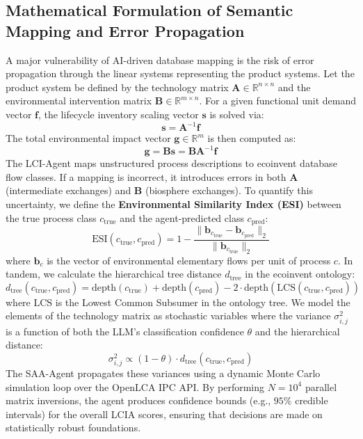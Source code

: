 \documentclass[11pt]{article}
\begin{document}
\subsection{Mathematical Formulation of Semantic Mapping and Error Propagation}
A major vulnerability of AI-driven database mapping is the risk of error propagation through the linear systems representing the product systems. Let the product system be defined by the technology matrix $\mathbf{A} \in \mathbb{R}^{n \times n}$ and the environmental intervention matrix $\mathbf{B} \in \mathbb{R}^{m \times n}$. For a given functional unit demand vector $\mathbf{f}$, the lifecycle inventory scaling vector $\mathbf{s}$ is solved via:
\begin{equation}
    \mathbf{s} = \mathbf{A}^{-1}\mathbf{f}
\end{equation}
The total environmental impact vector $\mathbf{g} \in \mathbb{R}^{m}$ is then computed as:
\begin{equation}
    \mathbf{g} = \mathbf{B}\mathbf{s} = \mathbf{B}\mathbf{A}^{-1}\mathbf{f}
\end{equation}
The LCI-Agent maps unstructured process descriptions to ecoinvent database flow classes. If a mapping is incorrect, it introduces errors in both $\mathbf{A}$ (intermediate exchanges) and $\mathbf{B}$ (biosphere exchanges). To quantify this uncertainty, we define the \textbf{Environmental Similarity Index (ESI)} between the true process class $c_{\text{true}}$ and the agent-predicted class $c_{\text{pred}}$:
\begin{equation}
    \text{ESI}(c_{\text{true}}, c_{\text{pred}}) = 1 - \frac{\| \mathbf{b}_{c_{\text{true}}} - \mathbf{b}_{c_{\text{pred}}} \|_2}{\| \mathbf{b}_{c_{\text{true}}} \|_2}
\end{equation}
where $\mathbf{b}_c$ is the vector of environmental elementary flows per unit of process $c$. In tandem, we calculate the hierarchical tree distance $d_{\text{tree}}$ in the ecoinvent ontology:
\begin{equation}
    d_{\text{tree}}(c_{\text{true}}, c_{\text{pred}}) = \text{depth}(c_{\text{true}}) + \text{depth}(c_{\text{pred}}) - 2 \cdot \text{depth}(\text{LCS}(c_{\text{true}}, c_{\text{pred}}))
\end{equation}
where $\text{LCS}$ is the Lowest Common Subsumer in the ontology tree. We model the elements of the technology matrix as stochastic variables where the variance $\sigma_{i,j}^2$ is a function of both the LLM's classification confidence $\theta$ and the hierarchical distance:
\begin{equation}
    \sigma_{i,j}^2 \propto (1 - \theta) \cdot d_{\text{tree}}(c_{\text{true}}, c_{\text{pred}})
\end{equation}
The SAA-Agent propagates these variances using a dynamic Monte Carlo simulation loop over the OpenLCA IPC API. By performing $N = 10^4$ parallel matrix inversions, the agent produces confidence bounds (e.g., $95\%$ credible intervals) for the overall LCIA scores, ensuring that decisions are made on statistically robust foundations.
\end{document}
